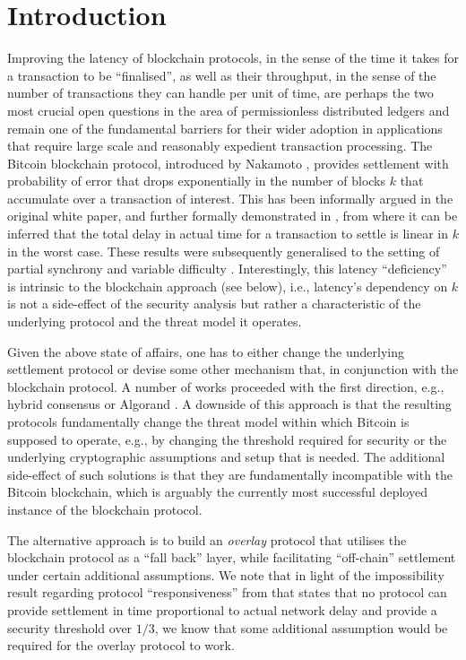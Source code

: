 
\section{Introduction}
\label{sec:intro}

Improving the latency of blockchain protocols, 
in the sense of the time it takes for a transaction to be ``finalised'',  
as well as their throughput, in the sense of the number of transactions they can handle per unit of time, 
are perhaps the two most crucial 
open questions in the area of permissionless distributed ledgers
and remain one of the fundamental barriers for their wider adoption in applications that  require large scale  and reasonably expedient transaction processing.
The Bitcoin blockchain protocol, introduced by Nakamoto \cite{bitcoin}, 
provides settlement with probability of error that drops exponentially
in the number of blocks $k$ that accumulate over a transaction of interest. 
This has been informally argued in the original white paper, 
and further formally demonstrated in \cite{gkl}, 
from where it can be inferred that the total delay in actual time 
for a transaction to settle
is linear in $k$ in the worst case. These results were subsequently
generalised to the setting of partial synchrony \cite{PSS16} and 
variable difficulty \cite{DBLP:conf/crypto/GarayKL17}. 
Interestingly, this latency ``deficiency'' is 
intrinsic to the blockchain approach (see below), i.e., 
latency's  dependency on $k$ is not a side-effect of the security analysis
but rather a characteristic of the underlying protocol and the threat model it operates. 

Given the above state of affairs, one has to either
change the underlying settlement protocol or devise some other mechanism that, 
in conjunction with the blockchain protocol.
A number of works proceeded with the first direction, e.g., hybrid consensus
\cite{DBLP:conf/wdag/PassS17} or Algorand \cite{DBLP:journals/corr/Micali16}. A downside of this approach is that the resulting protocols fundamentally change the threat model within which Bitcoin is supposed to operate, e.g., 
by changing the threshold required for security or the underlying cryptographic assumptions and setup that is needed. 
The additional side-effect of such solutions is that they are fundamentally incompatible with the Bitcoin blockchain, which is arguably  the currently most successful deployed instance  of the  blockchain protocol. 

The alternative approach is to build an {\em overlay} protocol that utilises the blockchain protocol as a ``fall back'' layer, while facilitating ``off-chain'' settlement under certain additional assumptions. We note that in light of the impossibility result regarding protocol ``responsiveness''  from \cite{DBLP:conf/wdag/PassS17} that states that no protocol can provide settlement in time proportional to actual network delay and provide a security threshold over $1/3$, we know that some additional assumption would be required for the overlay protocol to work.  

